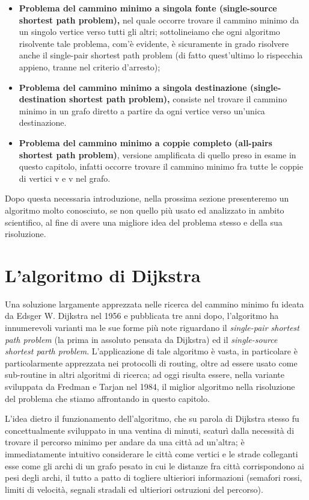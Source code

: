 \begin{itemize}
    \item \textbf{Problema del cammino minimo a singola fonte (single-source shortest path problem),} nel quale occorre trovare il cammino minimo da un singolo vertice verso tutti gli altri; sottolineiamo che ogni algoritmo risolvente tale problema, com'\`e evidente, \`e sicuramente in grado risolvere anche il single-pair shortest path problem (di fatto quest'ultimo lo rispecchia appieno, tranne nel criterio d'arresto);
    \item \textbf{Problema del cammino minimo a singola destinazione (single-destination shortest path problem),} consiste nel trovare il cammino minimo in un grafo diretto a partire da ogni vertice verso un'unica destinazione.
    \item \textbf{Problema del cammino minimo a coppie completo (all-pairs shortest path problem)}, versione amplificata di quello preso in esame in questo capitolo, infatti occorre trovare il cammino minimo fra tutte le coppie di vertici v e v nel grafo.
\end{itemize}

Dopo questa necessaria introduzione, nella prossima sezione presenteremo un algoritmo molto conosciuto, se non quello pi\`u usato ed analizzato in ambito scientifico, al fine di avere una migliore idea del problema stesso e della sua risoluzione.
\section{L'algoritmo di Dijkstra}
Una soluzione largamente apprezzata nelle ricerca del cammino minimo fu ideata da Edsger W. Dijkstra nel 1956 e pubblicata tre anni dopo, l'algoritmo ha innumerevoli varianti ma le sue forme pi\`u note riguardano il \textit{single-pair shortest path problem} (la prima in assoluto pensata da Dijkstra) ed il \textit{single-source shortest parth problem}. L'applicazione di tale algoritmo \`e vasta, in particolare \`e particolarmente apprezzata nei protocolli di routing, oltre ad essere usato come sub-routine in altri algoritmi di ricerca; ad oggi risulta essere, nella variante sviluppata da Fredman e Tarjan nel 1984, il miglior algoritmo nella risoluzione del problema che stiamo affrontando in questo capitolo.
\vspace{3mm}

L'idea dietro il funzionamento dell'algoritmo, che su parola di Dijkstra stesso fu concettualmente sviluppato in una ventina di minuti, scatur\`i dalla necessit\`a di trovare il percorso minimo per andare da una citt\`a ad un'altra; \`e immediatamente intuitivo considerare le citt\`a come vertici e le strade colleganti esse come gli archi di un grafo pesato in cui le distanze fra citt\`a corrispondono ai pesi degli archi, il tutto a patto di togliere ultieriori informazioni (semafori rossi, limiti di velocit\`a, segnali stradali ed ultieriori ostruzioni del percorso).

